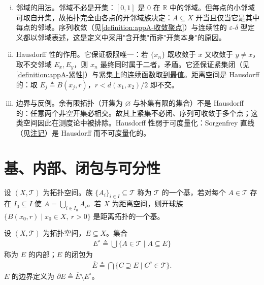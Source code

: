 \documentclass[../main.tex]{subfiles}
\begin{document}
\begin{remark}\label{remark:appA-邻域Hausdorff}
\begin{enumerate}[(i)]
\item 邻域的用法。邻域不必是开集：$[0,1]$ 是 $0$ 在 $\mathbb{R}$ 中的邻域。但每点的小邻域可取自开集，故拓扑完全由各点的开邻域族决定：$A\subseteq X$ 开当且仅当它是其中每点的邻域。序列收敛（见\cref{definition:appA-收敛聚点}）与连续性的 $\varepsilon$-$\delta$ 型定义都以邻域表述，这是定义中采用"含开集"而非"开集本身"的原因。
\item Hausdorff 性的作用。它保证极限唯一：若 $\{x_n\}$ 既收敛于 $x$ 又收敛于 $y\neq x$，取不交邻域 $E_x,E_y$，则 $x_n$ 最终同时属于二者，矛盾。它还保证紧集闭（见\cref{definition:appA-紧性}）与紧集上的连续函数取到最值。距离空间是 Hausdorff 的：取 $E_j\triangleq B(x_j,r)$，$r<d(x_1,x_2)/2$ 即不交。
\item 边界与反例。余有限拓扑（开集为 $\varnothing$ 与补集有限的集合）不是 Hausdorff 的：任意两个非空开集必相交。故其上紧集不必闭、序列可收敛于多个点；这类空间因此在测度论中被排除。Hausdorff 性弱于可度量化：Sorgenfrey 直线（见\hyperref[remark:appA-可分]{注记}）是 Hausdorff 而不可度量化的。
\end{enumerate}
\end{remark}

\section{基、内部、闭包与可分性}\label{section:appA-基闭包可分}

\begin{definition}[拓扑的基]\label{definition:appA-基}
设 $(X,\mathscr{T})$ 为拓扑空间。族 $\{A_i\}_{i\in I}\subseteq\mathscr{T}$ 称为 $\mathscr{T}$ 的一个基，若对每个 $A\in\mathscr{T}$ 存在 $I_0\subseteq I$ 使 $A=\bigcup_{i\in I_0}A_i$。若 $X$ 为距离空间，则开球族 $\{B(x_0,r)\mid x_0\in X,\ r>0\}$ 是距离拓扑的一个基。
\end{definition}

\begin{definition}[内部、闭包与边界]\label{definition:appA-内部闭包边界}
设 $(X,\mathscr{T})$ 为拓扑空间，$E\subseteq X$。集合
\begin{align*}
E^\circ\triangleq\bigcup\{A\in\mathscr{T}\mid A\subseteq E\}
\end{align*}
称为 $E$ 的内部；$E$ 的闭包为
\begin{align*}
\overline{E}\triangleq\bigcap\{C\supseteq E\mid C^c\in\mathscr{T}\}.
\end{align*}
$E$ 的边界定义为 $\partial E\triangleq\overline{E}\setminus E^\circ$。
\end{definition}
\end{document}
